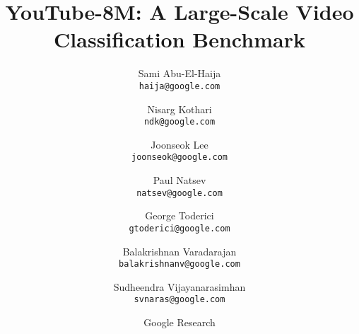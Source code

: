 \documentclass{sig-alternate-05-2015}
\begin{document}
\title{YouTube-8M: A Large-Scale Video Classification Benchmark}

\author{Sami Abu-El-Haija\\
{\tt\small haija@google.com} \\
\and
Nisarg Kothari \\
{\tt\small ndk@google.com} \\
\and
Joonseok Lee \\
{\tt\small joonseok@google.com} \\
\and
Paul Natsev \\
{\tt\small natsev@google.com} \\
\and
George Toderici \\
{\tt\small gtoderici@google.com} \\
\and
Balakrishnan Varadarajan \\
{\tt\small balakrishnanv@google.com} \\
\and
Sudheendra Vijayanarasimhan \\
{\tt\small svnaras@google.com} \\
\and
Google Research \\
}





\maketitle
\end{document}
